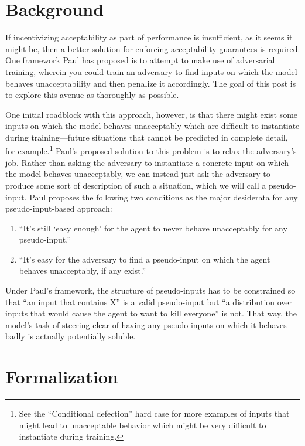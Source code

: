 \documentclass{amsart}
\begin{document}
\section{Background}

If incentivizing acceptability as part of performance is insufficient, as it seems it might be, then a better solution for enforcing acceptability guarantees is required. \href{https://ai-alignment.com/training-robust-corrigibility-ce0e0a3b9b4d}{One framework Paul has proposed} is to attempt to make use of adversarial training, wherein you could train an adversary to find inputs on which the model behaves unacceptability and then penalize it accordingly. The goal of this post is to explore this avenue as thoroughly as possible.

One initial roadblock with this approach, however, is that there might exist some inputs on which the model behaves unacceptably which are difficult to instantiate during training---future situations that cannot be predicted in complete detail, for example.\footnote{See the ``Conditional defection'' hard case for more examples of inputs that might lead to unacceptable behavior which might be very difficult to instantiate during training.} \href{https://ai-alignment.com/training-robust-corrigibility-ce0e0a3b9b4d}{Paul's proposed solution} to this problem is to relax the adversary's job. Rather than asking the adversary to instantiate a concrete input on which the model behaves unacceptably, we can instead just ask the adversary to produce some sort of description of such a situation, which we will call a pseudo-input. Paul proposes the following two conditions as the major desiderata for any pseudo-input-based approach:
\begin{enumerate}
    \item ``It's still ‘easy enough' for the agent to never behave unacceptably for any pseudo-input.''
    \item ``It's easy for the adversary to find a pseudo-input on which the agent behaves unacceptably, if any exist.''
\end{enumerate}
Under Paul's framework, the structure of pseudo-inputs has to be constrained so that ``an input that contains X'' is a valid pseudo-input but ``a distribution over inputs that would cause the agent to want to kill everyone'' is not. That way, the model's task of steering clear of having any pseudo-inputs on which it behaves badly is actually potentially soluble.

\section{Formalization}
\end{document}
